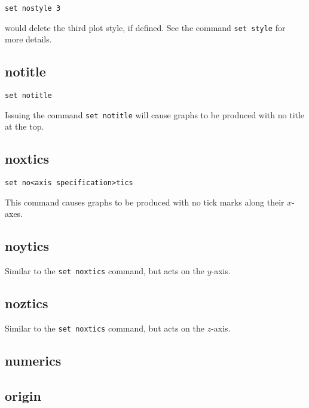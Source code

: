 \begin{verbatim}
set nostyle 3
\end{verbatim}

\noindent would delete the third plot style, if defined. See the command {\tt set
style} for more details.


\subsection{notitle}

\begin{verbatim}
set notitle
\end{verbatim}

Issuing the command {\tt set notitle} will cause graphs to be produced with no
title at the top.


\subsection{noxtics}

\begin{verbatim}
set no<axis specification>tics
\end{verbatim}

This command causes graphs to be produced with no tick marks along their $x$-axes.


\subsection{noytics}

Similar to the {\tt set noxtics} command, but acts on the $y$-axis.


\subsection{noztics}

Similar to the {\tt set noxtics} command, but acts on the $z$-axis.


\subsection{numerics}


\subsection{origin}

